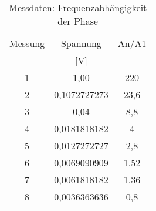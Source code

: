 
\begin{table}[h!]
  \centering
  \caption{Messdaten: Frequenzabhängigkeit der Phase}
  \label{tab:drei}
  \begin{tabular}{c c c}
    \toprule
Messung & Spannung & An/A1\\
 & [V] \\
    \midrule


  1	&  1,00  & 220\\
  2	&  0,1072727273  & 23,6\\
  3	&  0,04  & 8,8\\
  4	&  0,0181818182  & 4\\
  5	&  0,0127272727  & 2,8\\
  6	&  0,0069090909  & 1,52\\
  7	&  0,0061818182  & 1,36\\
  8	&  0,0036363636  & 0,8\\






    \bottomrule
  \end{tabular}
\end{table}

